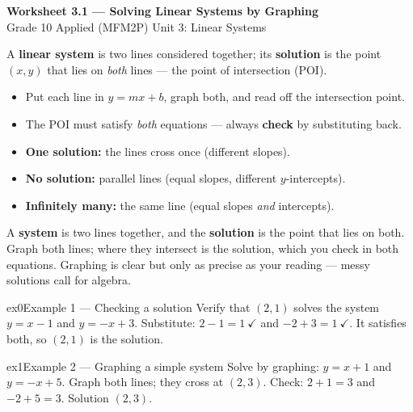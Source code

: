 \documentclass[11pt]{article}
\begin{document}
\begin{center}
{\LARGE\bfseries\color{titleblue}Worksheet 3.1 --- Solving Linear Systems by Graphing}\\[2pt]
{\small Grade 10 Applied (MFM2P) \textperiodcentered{} Unit 3: Linear Systems}
\end{center}

\begin{ideabox}
A \textbf{linear system} is two lines considered together; its \textbf{solution} is the point $(x,y)$ that lies on \emph{both} lines --- the point of intersection (POI).
\begin{itemize}[leftmargin=*,itemsep=2pt]
  \item Put each line in $y=mx+b$, graph both, and read off the intersection point.
  \item The POI must satisfy \emph{both} equations --- always \textbf{check} by substituting back.
  \item \textbf{One solution:} the lines cross once (different slopes).
  \item \textbf{No solution:} parallel lines (equal slopes, different $y$-intercepts).
  \item \textbf{Infinitely many:} the same line (equal slopes \emph{and} intercepts).
\end{itemize}
\end{ideabox}

\begin{learnbox}
A \textbf{system} is two lines together, and the \textbf{solution} is the point that lies on both.
Graph both lines; where they intersect is the solution, which you check in both equations.
Graphing is clear but only as precise as your reading — messy solutions call for algebra.
\end{learnbox}


\begin{example}{ex0}{Example 1 --- Checking a solution}
Verify that $(2,1)$ solves the system $y=x-1$ and $y=-x+3$.
\soln Substitute: $2-1=1\ \checkmark$ and $-2+3=1\ \checkmark$. It satisfies both, so $(2,1)$ is the solution.
\end{example}

\begin{example}{ex1}{Example 2 --- Graphing a simple system}
Solve by graphing: $y=x+1$ and $y=-x+5$.
\soln Graph both lines; they cross at $(2,3)$. Check: $2+1=3$ and $-2+5=3$. Solution $(2,3)$.
\end{example}
\end{document}
